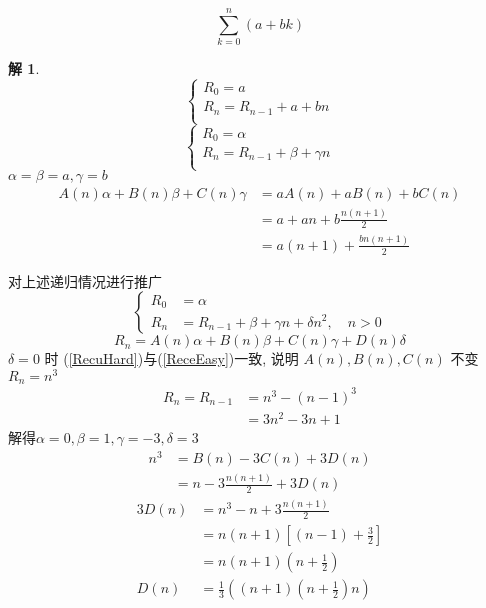 \documentclass[mode=geye]{elegantnote}
\newtheorem{solve}{解}
\begin{document}
\begin{example}
    \begin{equation*}
        \sum_{k=0}^{n}(a+b k)
    \end{equation*}
\end{example}
\begin{solve}
    \begin{equation*}
        \left\{
            \begin{array}{l}
                R_0 = a \\
                R_n = R_{n-1} + a+bn\\
            \end{array}
        \right.
    \end{equation*}
    \begin{equation*}
        \left\{
            \begin{array}{l}
                R_0 = \alpha \\
                R_n = R_{n-1} + \beta + \gamma n\\
            \end{array}
        \right.
    \end{equation*}
    $ \alpha = \beta =a, \gamma = b $ 
    \begin{align*}
        A(n)\alpha + B(n)\beta + C(n)\gamma 
        &= a A(n) + a B(n) + b C(n)\\
        &= a + a n + b \frac{n(n+1)}{2}\\
        &= a(n+1)+\frac{bn(n+1)}{2}
    \end{align*}
\end{solve}

对上述递归情况进行推广
\begin{equation}\label{RecuHard}
    \left\{
    \begin{aligned}
        R_0 &= \alpha \\
        R_n &= R_{n-1} + \beta + \gamma n + \delta n^2, \quad n>0
    \end{aligned}
    \right.
\end{equation}
\begin{equation}\label{RecuHardABC}
    R_n = A(n)\alpha + B(n)\beta + C(n)\gamma +D(n) \delta
\end{equation}
$ \delta=0 $ 时 (\ref{RecuHard})与(\ref{ReceEasy})一致, 说明
$ A(n), B(n), C(n) $ 不变\\
$ R_n = n^3 $ 
\begin{align*}
    R_n = R_{n-1} &= n^3 - (n-1)^3 \\
    &= 3n^2 - 3n + 1
\end{align*}
解得$ \alpha=0, \beta=1, \gamma=-3, \delta=3 $ 
\begin{align*}
    n^3 &= B(n)-3C(n)+3D(n)\\
    &= n-3 \frac{n(n+1)}{2}+3D(n)
\end{align*}
\begin{align*}
    3D(n) &= n^3 - n + 3 \frac{n(n+1)}{2} \\
    &= n(n+1) \left[(n-1)+\frac{3}{2}\right] \\
    &= n(n+1)(n+\frac{1}{2})\\
    D(n) &= \frac{1}{3}\left((n+1)(n+\frac{1}{2})n\right)
\end{align*}
\end{document}
